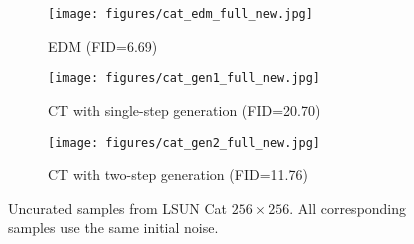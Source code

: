\begin{appendices}
\begin{figure}
    \centering
    \begin{subfigure}[b]{\textwidth}
        \texttt{[image: figures/cat\_edm\_full\_new.jpg]}
        \caption{EDM (FID=6.69)}
    \end{subfigure}
    \begin{subfigure}[b]{\textwidth}
        \texttt{[image: figures/cat\_gen1\_full\_new.jpg]}
        \caption{CT with single-step generation (FID=20.70)}
    \end{subfigure}
    \begin{subfigure}[b]{\textwidth}
        \texttt{[image: figures/cat\_gen2\_full\_new.jpg]}
        \caption{CT with two-step generation (FID=11.76)}
    \end{subfigure}
    \caption{Uncurated samples from LSUN Cat $256\times 256$. All corresponding samples use the same initial noise.}
    \label{fig:cat_full}
\end{figure}

\end{appendices}

